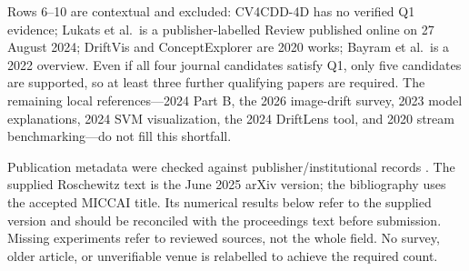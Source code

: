 \documentclass[10pt,a4paper]{article}
\begin{document}
Rows 6--10 are contextual and excluded: CV4CDD-4D has no verified Q1 evidence; Lukats et al.\ is a publisher-labelled Review published online on 27 August 2024; DriftVis and ConceptExplorer are 2020 works; Bayram et al.\ is a 2022 overview. Even if all four journal candidates satisfy Q1, only five candidates are supported, so at least three further qualifying papers are required. The remaining local references---2024 Part B, the 2026 image-drift survey, 2023 model explanations, 2024 SVM visualization, the 2024 DriftLens tool, and 2020 stream benchmarking---do not fill this shortfall.

Publication metadata were checked against publisher/institutional records \cite{greco,szucs,guerrero,assis,roschewitz,lukats}. The supplied Roschewitz text is the June 2025 arXiv version; the bibliography uses the accepted MICCAI title. Its numerical results below refer to the supplied version and should be reconciled with the proceedings text before submission. Missing experiments refer to reviewed sources, not the whole field. No survey, older article, or unverifiable venue is relabelled to achieve the required count.
\end{document}
